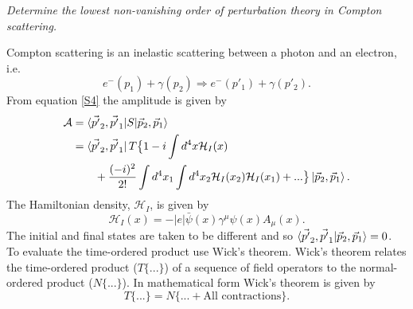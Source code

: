 \begin{example}
	\emph{Determine the lowest non-vanishing order of perturbation theory in Compton scattering.}\newline
	
	Compton scattering is an inelastic scattering between a photon and an electron,  i.e.
	\begin{equation}
		e^-(p_1)+\gamma(p_2)\Rightarrow e^-(p'_1)+\gamma(p'_2).
	\end{equation} 
	From equation \eqref{S4} the amplitude is given by
	\begin{equation}
		\begin{split}
			\mathcal{A}&=\braket{\vec{p'}_2,\vec{p'}_1|S|\vec{p}_2, \vec{p}_1}\\
			&=\bra{\vec{p'}_2,\vec{p'}_1}T\big\{1-i\int d^4x\mathcal{H}_I(x)\\
			&\qquad+\frac{(-i)^2}{2!}\int d^4x_1\int d^4 x_2\mathcal{H}_I(x_2)\mathcal{H}_I(x_1)+...\big\}\ket{\vec{p}_2, \vec{p}_1}.\\
		\end{split}
		\label{he}
	\end{equation} 
	The Hamiltonian density, $\mathcal{H}_I$, is given by
	\begin{equation}
		\mathcal{H}_{I}(x)=-|e|\bar{\psi}(x)\gamma^\mu\psi(x)A_\mu(x).
		\label{Hi}
	\end{equation} 
	The initial and final states are taken to be different and so $\braket{\vec{p'}_2,\vec{p'}_1|\vec{p}_2, \vec{p}_1}=0$. To evaluate the  time-ordered product use Wick's theorem. Wick's theorem relates the time-ordered product ($T\{...\}$) of a sequence of field operators to the normal-ordered product ($N\{...\}$). In mathematical form Wick's theorem is given by
	\begin{equation}
		T\{...\}=N\{...+\text{All contractions}\}.
	\end{equation} 

\end{example}
